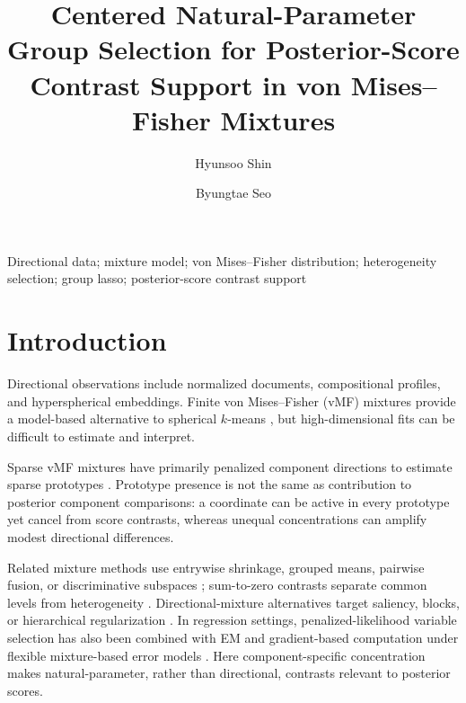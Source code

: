 \documentclass[preprint,12pt,authoryear]{elsarticle}
\def\corref#1{}%
\begin{document}
\begin{frontmatter}
\title{Centered Natural-Parameter Group Selection for Posterior-Score Contrast Support in von Mises--Fisher Mixtures}
\author[aff1]{Hyunsoo Shin}
\author[aff1]{Byungtae Seo\corref{cor1}}
\address[aff1]{Department of Statistics, Sungkyunkwan University, Seoul 03063, Republic of Korea}
\begin{abstract}
\end{abstract}
\begin{keyword}Directional data; mixture model; von Mises--Fisher distribution; heterogeneity selection; group lasso; posterior-score contrast support\end{keyword}
\end{frontmatter}

\section{Introduction}

Directional observations include normalized documents, compositional
profiles, and hyperspherical embeddings. Finite von Mises--Fisher (vMF)
mixtures provide a model-based alternative to spherical $k$-means
\citep{banerjee2005vmf}, but high-dimensional fits can be difficult to estimate
and interpret.

Sparse vMF mixtures have primarily penalized component directions to estimate
sparse prototypes \citep{rossi2022sparsevmf}. Prototype presence is not the
same as contribution to posterior component comparisons: a coordinate can be
active in every prototype yet cancel from score contrasts, whereas unequal
concentrations can amplify modest directional differences.

Related mixture methods use entrywise shrinkage, grouped means, pairwise
fusion, or discriminative subspaces
\citep{pan2007penalized,xie2008grouped,guo2010pairwise,
bouveyron2012fisher,bouveyron2014sparsefisher}; sum-to-zero contrasts separate
common levels from heterogeneity \citep{bondell2009anova}. Directional-mixture
alternatives target saliency, blocks, or hierarchical regularization
\citep{amayri2013online,salah2016coclustering,gopal2014vmf,
taghia2014bayesian,salah2019directional}. In regression settings,
penalized-likelihood variable selection has also been combined with EM and
gradient-based computation under flexible mixture-based error models
\citep{park2025penalized}. Here
component-specific concentration
makes natural-parameter, rather than directional, contrasts relevant to
posterior scores.
\end{document}
